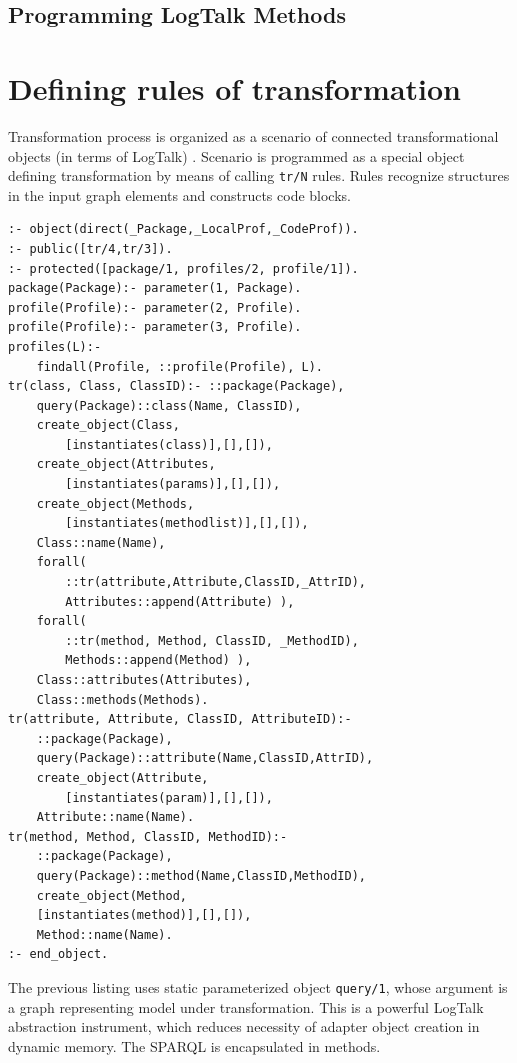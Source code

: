\documentclass[12pt,a4paper]{llncs}
\begin{document}
\subsection{Programming LogTalk Methods}
\label{sec:lgt-methods}

\section{Defining rules of transformation}
\label{sec:mda-rules}

Transformation process is organized as a scenario of connected transformational objects (in terms of LogTalk) \cite{tereh1}.  Scenario is programmed as a special object defining transformation by means of calling \verb|tr/N| rules.  Rules recognize structures in the input graph elements and constructs code blocks.

\begin{multicols}{2}
\begin{verbatim}
:- object(direct(_Package,_LocalProf,_CodeProf)).
:- public([tr/4,tr/3]).
:- protected([package/1, profiles/2, profile/1]).
package(Package):- parameter(1, Package).
profile(Profile):- parameter(2, Profile).
profile(Profile):- parameter(3, Profile).
profiles(L):-
    findall(Profile, ::profile(Profile), L).
tr(class, Class, ClassID):- ::package(Package),
    query(Package)::class(Name, ClassID),
    create_object(Class,
        [instantiates(class)],[],[]),
    create_object(Attributes,
        [instantiates(params)],[],[]),
    create_object(Methods,
        [instantiates(methodlist)],[],[]),
    Class::name(Name),
    forall(
        ::tr(attribute,Attribute,ClassID,_AttrID),
        Attributes::append(Attribute) ),
    forall(
        ::tr(method, Method, ClassID, _MethodID),
        Methods::append(Method) ),
    Class::attributes(Attributes),
    Class::methods(Methods).
tr(attribute, Attribute, ClassID, AttributeID):-
    ::package(Package),
    query(Package)::attribute(Name,ClassID,AttrID),
    create_object(Attribute,
        [instantiates(param)],[],[]),
    Attribute::name(Name).
tr(method, Method, ClassID, MethodID):-
    ::package(Package),
    query(Package)::method(Name,ClassID,MethodID),
    create_object(Method,
    [instantiates(method)],[],[]),
    Method::name(Name).
:- end_object.
\end{verbatim}
\end{multicols}

The previous listing uses static parameterized object \verb|query/1|, whose argument is a graph representing model under transformation.  This is a powerful LogTalk abstraction instrument, which reduces necessity of adapter object creation in dynamic memory.  The SPARQL is encapsulated in methods.
\end{document}
